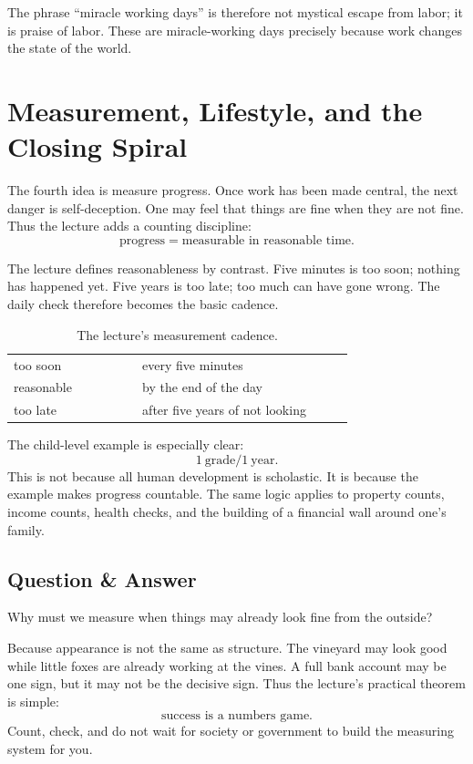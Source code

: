 The phrase ``miracle working days'' is therefore not mystical escape from labor; it is praise of labor. These are miracle-working days precisely because work changes the state of the world.

\section{Measurement, Lifestyle, and the Closing Spiral}

The fourth idea is measure progress. Once work has been made central, the next danger is self-deception. One may feel that things are fine when they are not fine. Thus the lecture adds a counting discipline:
\begin{equation}
\text{progress}=\text{measurable in reasonable time}.
\end{equation}

The lecture defines reasonableness by contrast. Five minutes is too soon; nothing has happened yet. Five years is too late; too much can have gone wrong. The daily check therefore becomes the basic cadence.

\begin{table}[h]
\centering
\begin{tabular}{p{0.28\linewidth} p{0.46\linewidth}}
too soon & every five minutes \\
reasonable & by the end of the day \\
too late & after five years of not looking
\end{tabular}
\caption{The lecture's measurement cadence.}
\end{table}

The child-level example is especially clear:
\begin{equation}
1\ \text{grade} / 1\ \text{year}.
\end{equation}
This is not because all human development is scholastic. It is because the example makes progress countable. The same logic applies to property counts, income counts, health checks, and the building of a financial wall around one's family.

\subsection{Question \& Answer}

Why must we measure when things may already look fine from the outside?

Because appearance is not the same as structure. The vineyard may look good while little foxes are already working at the vines. A full bank account may be one sign, but it may not be the decisive sign. Thus the lecture's practical theorem is simple:
\begin{equation}
\text{success is a numbers game}.
\end{equation}
Count, check, and do not wait for society or government to build the measuring system for you.

